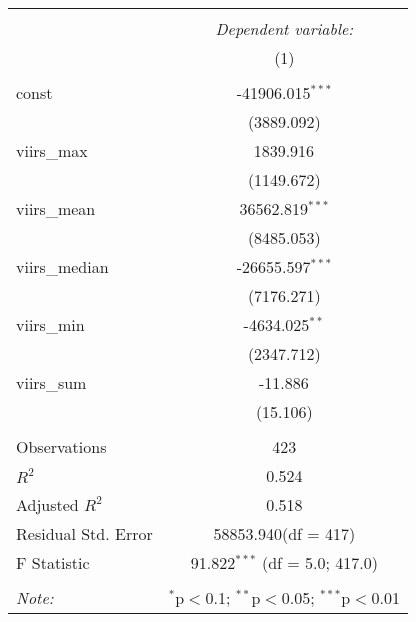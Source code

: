 \begin{table}[!htbp] \centering
\begin{tabular}{@{\extracolsep{5pt}}lc}
\\[-1.8ex]\hline
\hline \\[-1.8ex]
& \multicolumn{1}{c}{\textit{Dependent variable:}} \
\cr \cline{1-2}
\\[-1.8ex] & (1) \\
\hline \\[-1.8ex]
 const & -41906.015$^{***}$ \\
  & (3889.092) \\
 viirs_max & 1839.916$^{}$ \\
  & (1149.672) \\
 viirs_mean & 36562.819$^{***}$ \\
  & (8485.053) \\
 viirs_median & -26655.597$^{***}$ \\
  & (7176.271) \\
 viirs_min & -4634.025$^{**}$ \\
  & (2347.712) \\
 viirs_sum & -11.886$^{}$ \\
  & (15.106) \\
\hline \\[-1.8ex]
 Observations & 423 \\
 $R^2$ & 0.524 \\
 Adjusted $R^2$ & 0.518 \\
 Residual Std. Error & 58853.940(df = 417)  \\
 F Statistic & 91.822$^{***}$ (df = 5.0; 417.0) \\
\hline
\hline \\[-1.8ex]
\textit{Note:} & \multicolumn{1}{r}{$^{*}$p$<$0.1; $^{**}$p$<$0.05; $^{***}$p$<$0.01} \\
\end{tabular}
\end{table}